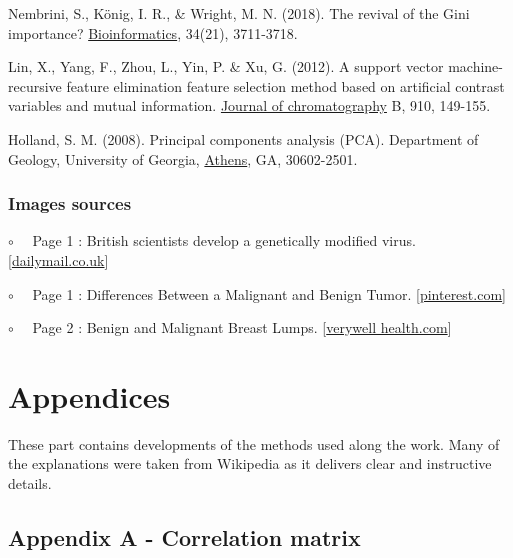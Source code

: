 \documentclass[12pt]{article}
\numberwithin{equation}{section}
\begin{document}
\begin{flushleft}
\begin{thebibliography}{9}
 \label{Method_GINI}
Nembrini, S., König, I. R., \& Wright, M. N. (2018). The revival of the Gini importance? \href{https://academic.oup.com/bioinformatics/article/34/21/3711/4994791}{Bioinformatics}, 34(21), 3711-3718.


 \label{Method_RFECV}
Lin, X., Yang, F., Zhou, L., Yin, P. \& Xu, G. (2012). A support vector machine-recursive feature elimination feature selection method based on artificial contrast variables and mutual information. \href{https://www.sciencedirect.com/science/article/abs/pii/S1570023212002929
}{Journal of chromatography} B, 910, 149-155.

 \label{PCA}
Holland, S. M. (2008). Principal components analysis (PCA). Department of Geology, University of Georgia, \href{http://strata.uga.edu/software/pdf/pcaTutorial.pdf}{Athens}, GA, 30602-2501.

\thispagestyle{empty}
\subsubsection*{Images sources}

$\circ \quad$ Page 1 : British scientists develop a genetically modified virus. [\href{https://www.dailymail.co.uk/health/article-6405481/British-scientists-develop-genetically-modified-virus-kills-cancer-cells.html}{dailymail.co.uk}]

$\circ \quad$ Page 1 : Differences Between a Malignant and Benign Tumor. [\href{https://www.pinterest.com/pin/622130135997884973/}{pinterest.com}]

$\circ \quad$ Page 2 : Benign and Malignant Breast Lumps. [\href{https://www.verywellhealth.com/understanding-breast-lumps-both-benign-and-cancerous-430415}{verywell health.com}]


\end{thebibliography}
\newpage

\thispagestyle{empty}
\section*{Appendices}
These part contains developments of the methods used along the work. Many of the explanations were taken from Wikipedia as it delivers clear and instructive details.

\subsection*{\hypertarget{corr_mat}{Appendix A} - Correlation matrix} 


\end{flushleft}
\end{document}
